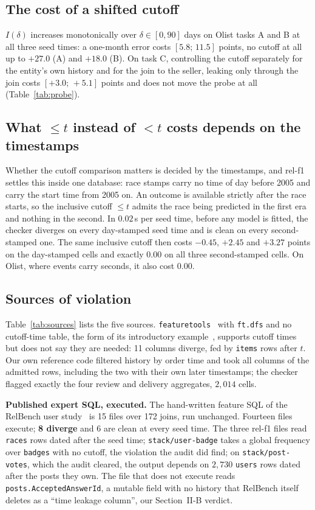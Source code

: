 \documentclass[conference]{IEEEtran}
\begin{document}
\subsection{The cost of a shifted cutoff}
$I(\delta)$ increases monotonically over $\delta\in[0,90]$ days on Olist tasks A and B
at all three seed times: a one-month error costs $[5.8;\,11.5]$ points, no cutoff at all
up to $+27.0$ (A) and $+18.0$ (B). On task C, controlling the cutoff separately for the
entity's own history and for the join to the seller, leaking only through the join costs
$[+3.0;\,+5.1]$ points and does not move the probe at all (Table~\ref{tab:probe}).

\subsection{What \mbox{$\le t$} instead of \mbox{$<t$} costs depends on the timestamps}
\label{sec:granularity}
Whether the cutoff comparison matters is decided by the timestamps, and \mbox{rel-f1}
settles this inside one database: race stamps carry no time of
day before 2005 and carry the start time from 2005 on. An outcome is available strictly
after the race starts, so the inclusive cutoff \mbox{$\le t$} admits the race being
predicted in the first era and nothing in the second. In $0.02$\,s per seed time, before
any model is fitted, the checker diverges on every day-stamped seed time and is clean on
every second-stamped one. The same inclusive cutoff then costs $-0.45$, $+2.45$ and
$+3.27$ points on the day-stamped cells and exactly $0.00$ on all three second-stamped
cells. On Olist, where events carry seconds, it also cost $0.00$.

\subsection{Sources of violation}\label{sec:sources}
Table~\ref{tab:sources} lists the five sources. \texttt{featuretools}~\cite{dfs} with
\texttt{ft.dfs} and no cutoff-time table, the form of its introductory
example~\cite{ftdocs}, supports cutoff times but does not say they are needed: 11
columns diverge, fed by \texttt{items} rows after $t$. Our own reference code filtered
history by order time and took all columns of the admitted rows, including the two with
their own later timestamps; the checker flagged exactly the four review and delivery
aggregates, $2{,}014$ cells.

\textbf{Published expert SQL, executed.} The hand-written feature SQL of the RelBench
user study~\cite{relbench} is 15 files over 172 joins, run unchanged. Fourteen files execute; \textbf{8 diverge} and 6 are clean at every seed time. The three \mbox{rel-f1} files read \texttt{races} rows dated
after the seed time; \texttt{stack/user-badge} takes a global frequency over
\texttt{badges} with no cutoff, the violation the audit did find; on
\texttt{stack/post-votes}, which the
audit cleared, the output depends on $2{,}730$ \texttt{users} rows dated after the posts
they own. The file that does not execute reads \texttt{posts.AcceptedAnswerId}, a
mutable field with no history that RelBench itself deletes as a ``time leakage column'',
our Section~II-B verdict.
\end{document}
